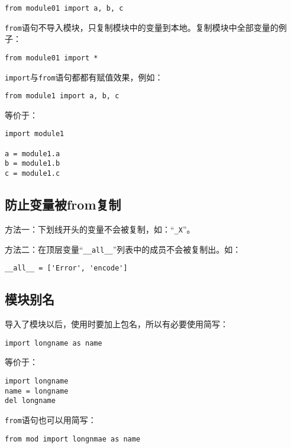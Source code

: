 \begin{lstlisting}
from module01 import a, b, c
\end{lstlisting}

\verb|from|语句不导入模块，只复制模块中的变量到本地。复制模块中全部变量的例子：

\begin{lstlisting}
from module01 import *
\end{lstlisting}

\verb|import|与\verb|from|语句都都有赋值效果，例如：

\begin{lstlisting}
from module1 import a, b, c
\end{lstlisting}

等价于：

\begin{lstlisting}
import module1

a = module1.a
b = module1.b
c = module1.c
\end{lstlisting}

\subsection{防止变量被from复制}

方法一：下划线开头的变量不会被复制，如：“\verb|_X|”。

方法二：在顶层变量“\verb|__all__|”列表中的成员不会被复制出。如：

\begin{lstlisting}
__all__ = ['Error', 'encode']
\end{lstlisting}

\subsection{模块别名}

导入了模块以后，使用时要加上包名，所以有必要使用简写：

\begin{lstlisting}
import longname as name
\end{lstlisting}

等价于：

\begin{lstlisting}
import longname
name = longname
del longname
\end{lstlisting}

\verb|from|语句也可以用简写：

\begin{lstlisting}
from mod import longnmae as name
\end{lstlisting}


